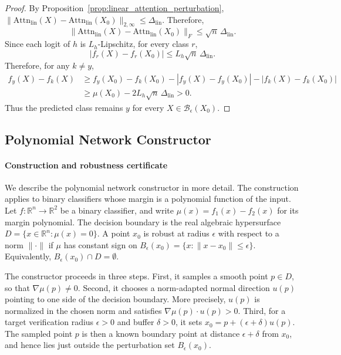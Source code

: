 \documentclass{article}
\theoremstyle{definition}
\begin{document}
\begin{proof}
By Proposition~\ref{prop:linear_attention_perturbation}, $\|\mathrm{Attn}_{\mathrm{lin}}(X)-\mathrm{Attn}_{\mathrm{lin}}(X_0)\|_{2,\infty}\leq\Delta_{\mathrm{lin}}$. Therefore,
\begin{equation}
    \|\mathrm{Attn}_{\mathrm{lin}}(X)-\mathrm{Attn}_{\mathrm{lin}}(X_0)\|_F
    \leq
    \sqrt n\,\Delta_{\mathrm{lin}}.
\end{equation}
Since each logit of $h$ is $L_h$-Lipschitz, for every class $r$,
\begin{equation}
    |f_r(X)-f_r(X_0)|
    \leq
    L_h\sqrt n\,\Delta_{\mathrm{lin}}.
\end{equation}
Therefore, for any $k\neq y$,
\begin{equation}
\begin{aligned}
    f_y(X)-f_k(X)
    &\geq
    f_y(X_0)-f_k(X_0)
    -
    |f_y(X)-f_y(X_0)|
    -
    |f_k(X)-f_k(X_0)| \\
    &\geq
    \mu(X_0)-2L_h\sqrt n\,\Delta_{\mathrm{lin}}
    >
    0.
\end{aligned}
\end{equation}
Thus the predicted class remains $y$ for every $X\in\mathcal B_\epsilon(X_0)$.
\end{proof}



\subsection{Polynomial Network Constructor}\label{app:pnn}

\paragraph{Construction and robustness certificate}\label{app:pnn-construction}

We describe the polynomial network constructor in more detail. The construction applies to binary classifiers whose margin is a polynomial function of the input. Let $f:\mathbb R^n\to \mathbb R^2$ be a binary classifier, and write
$\mu(x)=f_1(x)-f_2(x)$ for its margin polynomial. The decision boundary is the real algebraic hypersurface
$D=\{x\in\mathbb R^n:\mu(x)=0\}$. A point $x_0$ is robust at radius $\epsilon$ with respect to a norm $\|\cdot\|$ if $\mu$ has constant sign on $B_\epsilon(x_0)=\{x:\|x-x_0\|\leq \epsilon\}$. Equivalently, $B_\epsilon(x_0)\cap D=\emptyset$.

The constructor proceeds in three steps. First, it samples a smooth point $p\in D$, so that $\nabla \mu(p)\neq 0$. Second, it chooses a norm-adapted normal direction $u(p)$ pointing to one side of the decision boundary. More precisely, $u(p)$ is normalized in the chosen norm and satisfies $\nabla \mu(p)\cdot u(p)>0$. Third, for a target verification radius $\epsilon>0$ and buffer $\delta>0$, it sets $x_0=p+(\epsilon+\delta)u(p)$. The sampled point $p$ is then a known boundary point at distance $\epsilon+\delta$ from $x_0$, and hence lies just outside the perturbation set $B_\epsilon(x_0)$.
\end{document}
